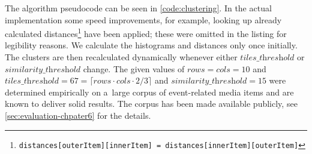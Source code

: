 The algorithm pseudocode can be seen in \autoref{code:clustering}.
In the actual implementation some speed improvements,
for example, looking up already calculated
distances\footnote{\texttt{distances[outerItem][innerItem] =
distances[innerItem][outerItem]}}
have been applied;
these were omitted in the listing for legibility reasons.
We calculate the histograms and distances only once initially.
The clusters are then recalculated dynamically
whenever either $\textit{tiles\_threshold}$ or $\textit{similarity\_threshold}$ change.
The given values of $\textit{rows} = \textit{cols} = 10$ and
$\textit{tiles\_threshold} = 67 = \lceil \textit{rows} \cdot \textit{cols} \cdot 2/3 \rceil$
and $\textit{similarity\_threshold} = 15$ were determined empirically
on a~large corpus of event-related media items
and are known to deliver solid results.
The corpus has been made available publicly,
see \autoref{sec:evaluation-chpater6} for the details.

